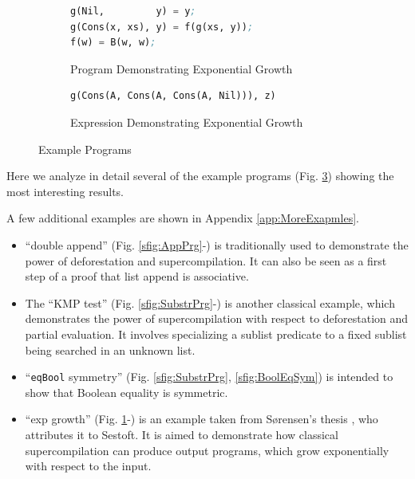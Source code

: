 \documentclass[submission,copyright,creativecommons]{eptcs}
\newif\ifVptVer
\begin{document}
\begin{figure}
\begin{subfigure}[b]{\linewidth}
\begin{lstlisting}[language=Lisp,keywords={}]
g(Nil,         y) = y;
g(Cons(x, xs), y) = f(g(xs, y));
f(w) = B(w, w);
\end{lstlisting}
\caption{Program Demonstrating Exponential Growth}
\label{sfig:ExpGrowthPrg}
\end{subfigure}

\begin{subfigure}[b]{\linewidth}
\begin{lstlisting}[language=Lisp,keywords={}]
g(Cons(A, Cons(A, Cons(A, Nil))), z)
\end{lstlisting}
\caption{Expression Demonstrating Exponential Growth}
\label{sfig:ExpGrowth}
\end{subfigure}

\caption{Example Programs}\label{fig:Examples}
\end{figure}

Here we analyze in detail several of the example programs (Fig. \ref{fig:Examples}) showing the most interesting results.
\ifVptVer
The extended version of this article \cite{krustev2020controlling} discusses a few additional examples.
\else
A few additional examples are shown in Appendix \ref{app:MoreExapmles}.
\fi
\begin{itemize}
  \item ``double append'' (Fig. \ref{sfig:AppPrg}-) is traditionally used to 
    demonstrate the power of deforestation and supercompilation.
    It can also be seen as a first step of a proof that list append is associative.
  \item The ``KMP test'' (Fig. \ref{sfig:SubstrPrg}-) is another classical example, 
    which demonstrates the power of supercompilation with respect to deforestation and partial evaluation.
    It involves specializing a sublist predicate to a fixed sublist being
    searched in an unknown list.
  \item ``\verb|eqBool| symmetry'' (Fig. \ref{sfig:SubstrPrg}, \ref{sfig:BoolEqSym}) is intended
    to show that Boolean equality is symmetric.
  \item ``exp growth'' (Fig. \ref{sfig:ExpGrowthPrg}-) is an example taken 
    from S{\o}rensen's thesis \cite[Example 11.4.1]{Sorensen1994TurchinSupercompiler}, who attributes it to Sestoft.
    It is aimed to demonstrate how classical supercompilation can produce output programs,
    which grow exponentially with respect to the input.
\end{itemize}
\end{document}

